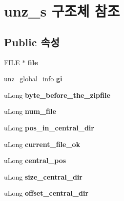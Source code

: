 \hypertarget{structunz__s}{}\section{unz\+\_\+s 구조체 참조}
\label{structunz__s}
\subsection*{Public 속성}
\begin{DoxyCompactItemize}
\item 
\mbox{\label{structunz__s_ae3672e9d6fcd9741941ed1ba376f86c7}} 
F\+I\+LE $\ast$ {\bfseries file}
\item 
\mbox{\label{structunz__s_a131303f89af11a26b53e99a58d6517cf}} 
\mbox{\hyperlink{structunz__global__info__s}{unz\+\_\+global\+\_\+info}} {\bfseries gi}
\item 
\mbox{\label{structunz__s_a788688a8021cbbba6a2ac1765edd362e}} 
u\+Long {\bfseries byte\+\_\+before\+\_\+the\+\_\+zipfile}
\item 
\mbox{\label{structunz__s_a737337b347bd5cc52bfabdcfbc11b853}} 
u\+Long {\bfseries num\+\_\+file}
\item 
\mbox{\label{structunz__s_a70f2901a7ba85573aa280bad826baf4a}} 
u\+Long {\bfseries pos\+\_\+in\+\_\+central\+\_\+dir}
\item 
\mbox{\label{structunz__s_abe2244ba62db8b3251634e26183f1c9a}} 
u\+Long {\bfseries current\+\_\+file\+\_\+ok}
\item 
\mbox{\label{structunz__s_a2d8ae4c0975d2057e30b13c3148c27eb}} 
u\+Long {\bfseries central\+\_\+pos}
\item 
\mbox{\label{structunz__s_a60b803a02e17ae46755cb94026ae973a}} 
u\+Long {\bfseries size\+\_\+central\+\_\+dir}
\item 
\mbox{\label{structunz__s_ac6c37ef70549769fa59bca623565d78f}} 
u\+Long {\bfseries offset\+\_\+central\+\_\+dir}
\item 
\mbox{\label{structunz__s_ab1963897ac959ca0f9b4208c573c2795}} 

\end{DoxyCompactItemize}
